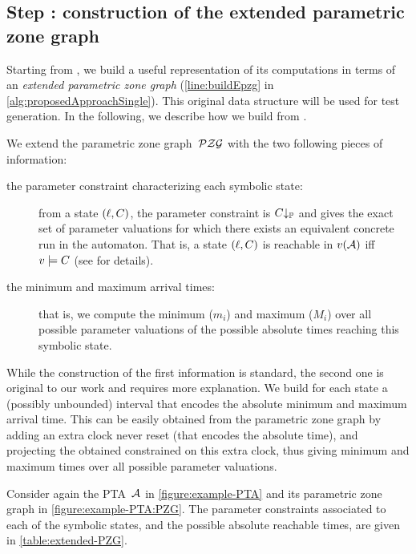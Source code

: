 \begin{tikzborder}{\cite{Gargantini16:validation}}
\begin{tikzborder}{\cite{gargantini_combinatorial_2017}}
\begin{tikzborder}{\cite{gargantini_combinatorial_2017}}
\begin{tikzborder}{\cite{garn2019}}
\begin{tikzborder}{\cite{arcaini2019achieving}}
\begin{tikzborder}{\cite{arcaini2019varivolution}}
\subsection{Step : construction of the extended parametric zone graph}
\begin{tikzborder}{}
Starting from \ptaProc, we build a useful representation of its computations in terms of an {\it extended parametric zone graph} \epzg (\ref{line:buildEpzg} in \ref{alg:proposedApproachSingle}).
This original data structure will be used for test generation.
In the following, we describe how we build \epzg from \PZG.

We extend the parametric zone graph~$\mathcal{PZG}$ with the two following pieces of information:
\begin{description}
	\item[the parameter constraint characterizing each symbolic state:] from a state $(\ell, C)$, the parameter constraint is $C{\downarrow_{\mathbb{P}}}$ and gives the exact set of parameter valuations for which there exists an equivalent concrete run in the automaton. That is, a state $(\ell, C)$ is reachable in $v(\mathcal{A})$ iff $v \models C$ (see \cite{JLR15} for details).
	\item[the minimum and maximum arrival times:] that is, we compute the minimum ($m_i$) and maximum ($M_i$) over all possible parameter valuations of the possible absolute times reaching this symbolic state.
\end{description}
While the construction of the first information is standard, the second one is original to our work and requires more explanation.
We build for each state a (possibly unbounded) interval that encodes the absolute minimum and maximum arrival time.
This can be easily obtained from the parametric zone graph by adding an extra clock never reset (that encodes the absolute time), and projecting the obtained constrained on this extra clock, thus giving minimum and maximum times over all possible parameter valuations.

\begin{example}\label{example:structure}
	Consider again the PTA~$\mathcal{A}$ in \ref{figure:example-PTA} and its parametric zone graph in \ref{figure:example-PTA:PZG}. The parameter constraints associated to each of the symbolic states, and the possible absolute reachable times, are given in \ref{table:extended-PZG}.
	
	\begin{figure}[tb]
		

\end{figure}
\end{example}
\end{tikzborder}
\end{tikzborder}
\end{tikzborder}
\end{tikzborder}
\end{tikzborder}
\end{tikzborder}
\end{tikzborder}
